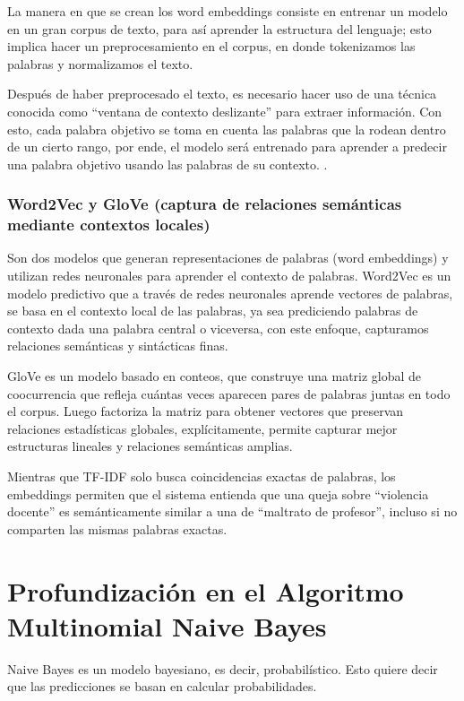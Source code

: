 La manera en que se crean los word embeddings consiste en entrenar un modelo en un gran corpus de texto, para así aprender la estructura del lenguaje; esto implica hacer un preprocesamiento en el corpus, en donde tokenizamos las palabras y normalizamos el texto.

Después de haber preprocesado el texto, es necesario hacer uso de una técnica conocida como “ventana de contexto deslizante” para extraer información. Con esto, cada palabra objetivo se toma en cuenta las palabras que la rodean dentro de un cierto rango, por ende, el modelo será entrenado para aprender a predecir una palabra objetivo usando las palabras de su contexto.
.

\subsubsection{Word2Vec y GloVe (captura de relaciones semánticas mediante contextos locales)}

Son dos modelos que generan representaciones de palabras (word embeddings) y utilizan redes neuronales para aprender el contexto de palabras.
Word2Vec es un modelo predictivo que a través de redes neuronales aprende vectores de palabras, se basa en el contexto local de las palabras, ya sea prediciendo palabras de contexto dada una palabra central o viceversa, con este enfoque, capturamos relaciones semánticas y sintácticas finas.

GloVe es un modelo basado en conteos, que construye una matriz global de coocurrencia que refleja cuántas veces aparecen pares de palabras juntas en todo el corpus. Luego factoriza la matriz para obtener vectores que preservan relaciones estadísticas globales, explícitamente, permite capturar mejor estructuras lineales y relaciones semánticas amplias.

Mientras que TF-IDF solo busca coincidencias exactas de palabras, los embeddings permiten que el sistema entienda que una queja sobre “violencia docente” es semánticamente similar a una de “maltrato de profesor”, incluso si no comparten las mismas palabras exactas.

\section{Profundización en el Algoritmo Multinomial Naive Bayes}

Naive Bayes es un modelo bayesiano, es decir, probabilístico. Esto quiere decir que las predicciones se basan en calcular probabilidades.

